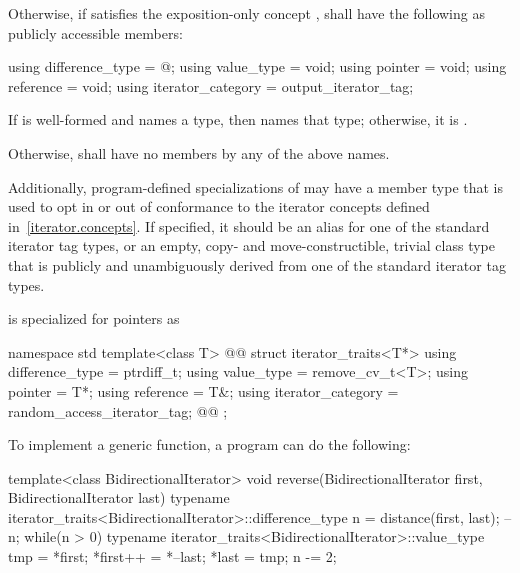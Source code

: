 \begin{itemize}
{\item
Otherwise, if  satisfies the exposition-only concept
,  shall
have the following as publicly accessible members:
\begin{codeblock}
  using difference_type   = @\seebelownc@;
  using value_type        = void;
  using pointer           = void;
  using reference         = void;
  using iterator_category = output_iterator_tag;
\end{codeblock}
If  is well-formed
and names a type, then  names that type; otherwise, it is
.
} %

\item
Otherwise, 
shall have no members by any of the above names.
\end{itemize}

{\color{newclr}
\pnum
Additionally, program-defined specializations of  may
have a member type  that is used to opt in or out of
conformance to the iterator concepts defined in~\ref{iterator.concepts}. If
specified, it should be an alias for one of the standard iterator tag
types, or an empty, copy- and move-constructible,
trivial class type that is publicly and unambiguously derived from one of the
standard iterator tag types.
} %

\pnum
{} is specialized for pointers as

\begin{codeblock}
namespace std {
  template<class T>
  @@
  struct iterator_traits<T*> {
    using difference_type   = ptrdiff_t;
    using value_type        = remove_cv_t<T>;
    using pointer           = T*;
    using reference         = T&;
    using iterator_category = random_access_iterator_tag;
    @\newtxt{ }\newtxt{ }@
  };
}
\end{codeblock}

\pnum
\begin{example}
To implement a generic
function, a \Cpp{} program can do the following:

\begin{codeblock}
template<class BidirectionalIterator>
void reverse(BidirectionalIterator first, BidirectionalIterator last) {
  typename iterator_traits<BidirectionalIterator>::difference_type n =
    distance(first, last);
  --n;
  while(n > 0) {
    typename iterator_traits<BidirectionalIterator>::value_type
     tmp = *first;
    *first++ = *--last;
    *last = tmp;
    n -= 2;
  }
}
\end{codeblock}
\end{example}

